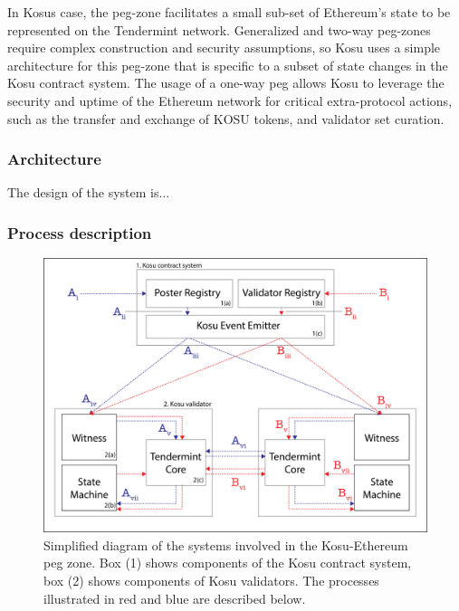 \documentclass[10pt]{article}
\begin{document}
In Kosus case, the peg-zone facilitates a small sub-set of Ethereum's state to be represented on the Tendermint network. Generalized and two-way peg-zones require  complex construction and security assumptions, so Kosu uses a simple architecture for this peg-zone that is specific to a subset of state changes in the Kosu contract system. The usage of a one-way peg allows Kosu to leverage the security and uptime of the Ethereum network for critical extra-protocol actions, such as the transfer and exchange of KOSU tokens, and validator set curation.

\subsubsection{Architecture}\label{peg-architecture}
The design of the system is...

\subsubsection{Process description}\label{peg-process}
\begin{figure}[H]
  \centering
  \includegraphics[width=\textwidth]{../figures/fig1.png}
  \caption{Simplified diagram of the systems involved in the Kosu-Ethereum peg zone. Box (1) shows components of the Kosu contract system, box (2) shows components of Kosu validators. The processes illustrated in red and blue are described below.}
  \label{fig:fig2}
\end{figure}

\end{document}
